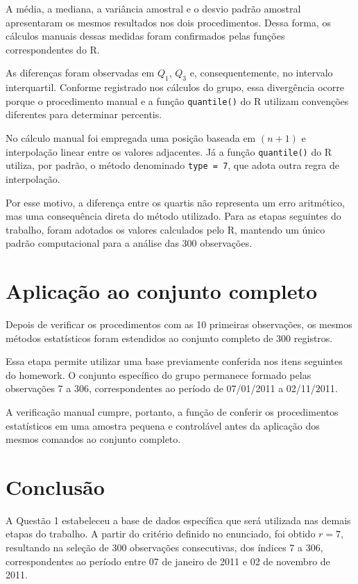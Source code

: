 \documentclass[12pt,a4paper]{article}
\begin{document}
A média, a mediana, a variância amostral e o desvio padrão amostral apresentaram
os mesmos resultados nos dois procedimentos. Dessa forma, os cálculos manuais
dessas medidas foram confirmados pelas funções correspondentes do R.

As diferenças foram observadas em $Q_1$, $Q_3$ e, consequentemente, no intervalo
interquartil. Conforme registrado nos cálculos do grupo, essa divergência ocorre
porque o procedimento manual e a função \texttt{quantile()} do R utilizam
convenções diferentes para determinar percentis.

No cálculo manual foi empregada uma posição baseada em $(n+1)$ e interpolação
linear entre os valores adjacentes. Já a função \texttt{quantile()} do R utiliza,
por padrão, o método denominado \texttt{type = 7}, que adota outra regra de
interpolação.

Por esse motivo, a diferença entre os quartis não representa um erro aritmético,
mas uma consequência direta do método utilizado. Para as etapas seguintes do
trabalho, foram adotados os valores calculados pelo R, mantendo um único padrão
computacional para a análise das 300 observações.

\section{Aplicação ao conjunto completo}

Depois de verificar os procedimentos com as 10 primeiras observações, os mesmos
métodos estatísticos foram estendidos ao conjunto completo de 300 registros.

Essa etapa permite utilizar uma base previamente conferida nos itens seguintes
do homework. O conjunto específico do grupo permanece formado pelas observações
7 a 306, correspondentes ao período de 07/01/2011 a 02/11/2011.

A verificação manual cumpre, portanto, a função de conferir os procedimentos
estatísticos em uma amostra pequena e controlável antes da aplicação dos mesmos
comandos ao conjunto completo.

\section{Conclusão}

A Questão 1 estabeleceu a base de dados específica que será utilizada nas
demais etapas do trabalho. A partir do critério definido no enunciado, foi
obtido $r=7$, resultando na seleção de 300 observações consecutivas, dos índices
7 a 306, correspondentes ao período entre 07 de janeiro de 2011 e 02 de novembro
de 2011.
\end{document}
